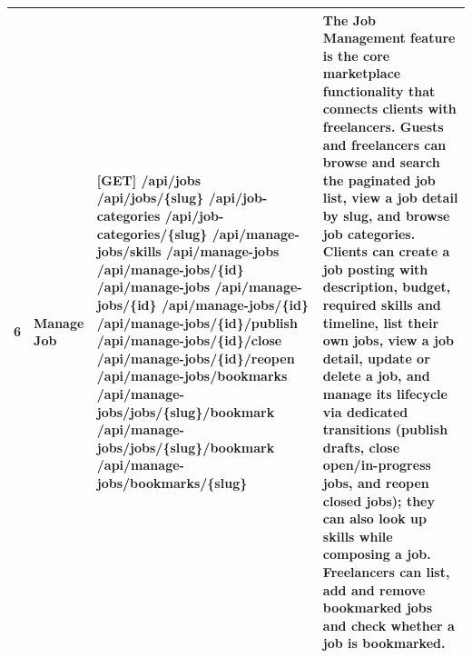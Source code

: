\begin{longtable}{|C{0.7cm}|L{2.6cm}|S{6.6cm}|L{5.2cm}|}
6
&
\textbf{Manage Job}
&
[GET] /\allowbreak{}api/\allowbreak{}jobs \newline
[GET] /\allowbreak{}api/\allowbreak{}jobs/\allowbreak{}\{slug\} \newline
[GET] /\allowbreak{}api/\allowbreak{}job-categories \newline
[GET] /\allowbreak{}api/\allowbreak{}job-categories/\allowbreak{}\{slug\} \newline
[GET] /\allowbreak{}api/\allowbreak{}manage-jobs/\allowbreak{}skills \newline
[GET] /\allowbreak{}api/\allowbreak{}manage-jobs \newline
[GET] /\allowbreak{}api/\allowbreak{}manage-jobs/\allowbreak{}\{id\} \newline
[POST] /\allowbreak{}api/\allowbreak{}manage-jobs \newline
[PUT] /\allowbreak{}api/\allowbreak{}manage-jobs/\allowbreak{}\{id\} \newline
[DELETE] /\allowbreak{}api/\allowbreak{}manage-jobs/\allowbreak{}\{id\} \newline
[PATCH] /\allowbreak{}api/\allowbreak{}manage-jobs/\allowbreak{}\{id\}/\allowbreak{}publish \newline
[PATCH] /\allowbreak{}api/\allowbreak{}manage-jobs/\allowbreak{}\{id\}/\allowbreak{}close \newline
[PATCH] /\allowbreak{}api/\allowbreak{}manage-jobs/\allowbreak{}\{id\}/\allowbreak{}reopen \newline
[GET] /\allowbreak{}api/\allowbreak{}manage-jobs/\allowbreak{}bookmarks \newline
[POST] /\allowbreak{}api/\allowbreak{}manage-jobs/\allowbreak{}jobs/\allowbreak{}\{slug\}/\allowbreak{}bookmark \newline
[GET] /\allowbreak{}api/\allowbreak{}manage-jobs/\allowbreak{}jobs/\allowbreak{}\{slug\}/\allowbreak{}bookmark \newline
[DELETE] /\allowbreak{}api/\allowbreak{}manage-jobs/\allowbreak{}bookmarks/\allowbreak{}\{slug\}
&
The Job Management feature is the core marketplace functionality that connects clients with freelancers. Guests and freelancers can browse and search the paginated job list, view a job detail by slug, and browse job categories. Clients can create a job posting with description, budget, required skills and timeline, list their own jobs, view a job detail, update or delete a job, and manage its lifecycle via dedicated transitions (publish drafts, close open/in-progress jobs, and reopen closed jobs); they can also look up skills while composing a job. Freelancers can list, add and remove bookmarked jobs and check whether a job is bookmarked.
\\ \hline


\end{longtable}
